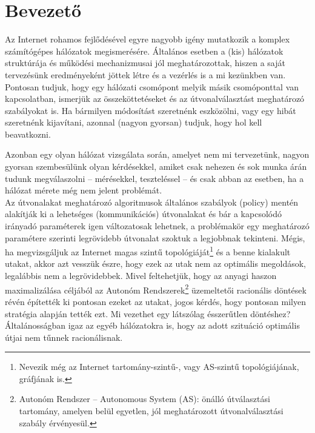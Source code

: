 \chapter*{Bevezető}

Az Internet rohamos fejlődésével egyre nagyobb igény mutatkozik a komplex számítógépes hálózatok megismerésére. Általános esetben a (kis) hálózatok struktúrája és működési mechanizmusai jól meghatározottak, hiszen a saját tervezésünk eredményeként jöttek létre és a vezérlés is a mi kezünkben van. Pontosan tudjuk, hogy egy hálózati csomópont melyik másik csomóponttal van kapcsolatban, ismerjük az összeköttetéseket és az útvonalválasztást meghatározó szabályokat is. Ha bármilyen módosítást szeretnénk eszközölni, vagy egy hibát szeretnénk kijavítani, azonnal (nagyon gyorsan) tudjuk, hogy hol kell beavatkozni.

Azonban egy olyan hálózat vizsgálata során, amelyet nem mi tervezetünk, nagyon gyorsan szembesülünk olyan kérdésekkel, amiket csak nehezen és sok munka árán tudunk megválaszolni -- mérésekkel, teszteléssel -- és csak abban az esetben, ha a hálózat mérete még nem jelent problémát.\\

Az útvonalakat meghatározó algoritmusok általános szabályok (policy) mentén alakítják ki a lehetséges (kommunikációs) útvonalakat és bár a kapcsolódó irányadó paraméterek igen változatosak lehetnek, a problémakör egy meghatározó paramétere szerinti legrövidebb útvonalat szoktuk a legjobbnak tekinteni. Mégis, ha megvizsgáljuk az Internet magas szintű topológiáját\footnote{Nevezik még az Internet tartomány-szintű-, vagy AS-szintű topológiájának, gráfjának is.} és a benne kialakult utakat, akkor azt vesszük észre, hogy ezek az utak nem az optimális megoldások, legalábbis nem a legrövidebbek. Mivel feltehetjük, hogy az anyagi haszon maximalizálása céljából az Autonóm Rendszerek\footnote{Autonóm Rendszer -- Autonomous System (AS): önálló útválasztási tartomány, amelyen belül egyetlen, jól meghatározott útvonalválasztási szabály érvényesül.} üzemeltetői racionális döntések révén építették ki pontosan ezeket az utakat, jogos kérdés, hogy pontosan milyen stratégia alapján tették ezt. Mi vezethet egy látszólag ésszerűtlen döntéshez? Általánosságban igaz az egyéb hálózatokra is, hogy az adott szituáció optimális útjai nem tűnnek racionálisnak.\\

